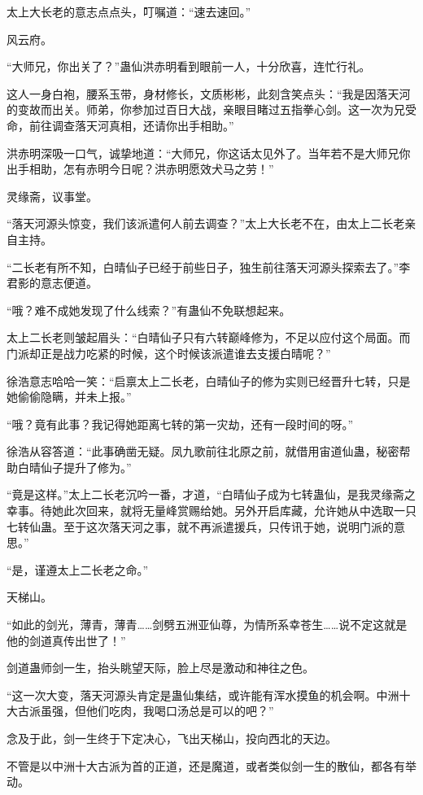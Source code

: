 \begin{this_body}
太上大长老的意志点点头，叮嘱道：“速去速回。”

风云府。

“大师兄，你出关了？”蛊仙洪赤明看到眼前一人，十分欣喜，连忙行礼。

这人一身白袍，腰系玉带，身材修长，文质彬彬，此刻含笑点头：“我是因落天河的变故而出关。师弟，你参加过百日大战，亲眼目睹过五指拳心剑。这一次为兄受命，前往调查落天河真相，还请你出手相助。”

洪赤明深吸一口气，诚挚地道：“大师兄，你这话太见外了。当年若不是大师兄你出手相助，怎有赤明今日呢？洪赤明愿效犬马之劳！”

灵缘斋，议事堂。

“落天河源头惊变，我们该派遣何人前去调查？”太上大长老不在，由太上二长老亲自主持。

“二长老有所不知，白晴仙子已经于前些日子，独生前往落天河源头探索去了。”李君影的意志便道。

“哦？难不成她发现了什么线索？”有蛊仙不免联想起来。

太上二长老则皱起眉头：“白晴仙子只有六转巅峰修为，不足以应付这个局面。而门派却正是战力吃紧的时候，这个时候该派遣谁去支援白晴呢？”

徐浩意志哈哈一笑：“启禀太上二长老，白晴仙子的修为实则已经晋升七转，只是她偷偷隐瞒，并未上报。”

“哦？竟有此事？我记得她距离七转的第一灾劫，还有一段时间的呀。”

徐浩从容答道：“此事确凿无疑。凤九歌前往北原之前，就借用宙道仙蛊，秘密帮助白晴仙子提升了修为。”

“竟是这样。”太上二长老沉吟一番，才道，“白晴仙子成为七转蛊仙，是我灵缘斋之幸事。待她此次回来，就将无量峰赏赐给她。另外开启库藏，允许她从中选取一只七转仙蛊。至于这次落天河之事，就不再派遣援兵，只传讯于她，说明门派的意思。”

“是，谨遵太上二长老之命。”

天梯山。

“如此的剑光，薄青，薄青……剑劈五洲亚仙尊，为情所系幸苍生……说不定这就是他的剑道真传出世了！”

剑道蛊师剑一生，抬头眺望天际，脸上尽是激动和神往之色。

“这一次大变，落天河源头肯定是蛊仙集结，或许能有浑水摸鱼的机会啊。中洲十大古派虽强，但他们吃肉，我喝口汤总是可以的吧？”

念及于此，剑一生终于下定决心，飞出天梯山，投向西北的天边。

不管是以中洲十大古派为首的正道，还是魔道，或者类似剑一生的散仙，都各有举动。


\end{this_body}
